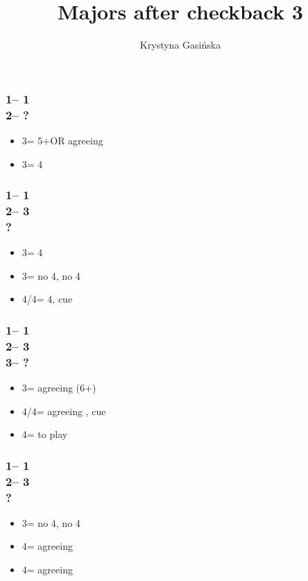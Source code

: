 \documentclass[12pt, a4paper]{article}
\title{Majors after checkback 3\clubs}
\author{Krystyna Gasińska}
\begin{document}
\maketitle


\subsubsection*{1\minor -- 1\hearts \\ 2\nt -- ?}
\begin{itemize}
    \item 3\hearts = 5+\spades OR agreeing \hearts
    \item 3\spades = 4\spades
\end{itemize}

\subsubsection*{1\minor -- 1\hearts \\ 2\nt -- 3\hearts \\ ?}
\begin{itemize}
    \item 3\spades  = 4\spades
    \item 3\nt = no 4\spades, no 4\hearts
    \item 4\clubs/4\diams = 4\hearts, cue
\end{itemize}

\subsubsection*{1\minor -- 1\hearts \\ 2\nt -- 3\hearts \\ 3\spades -- ?}
\begin{itemize}
    \item 3\nt = agreeing \hearts (6+)
    \item 4\clubs/4\diams = agreeing \spades, cue
    \item 4\hearts = to play
\end{itemize}

\subsubsection*{1\minor -- 1\hearts \\ 2\nt -- 3\spades \\ ?}
\begin{itemize}
    \item 3\nt = no 4\spades, no 4\hearts
    \item 4\clubs = agreeing \hearts
    \item 4\diams = agreeing \spades
\end{itemize}

\end{document}
